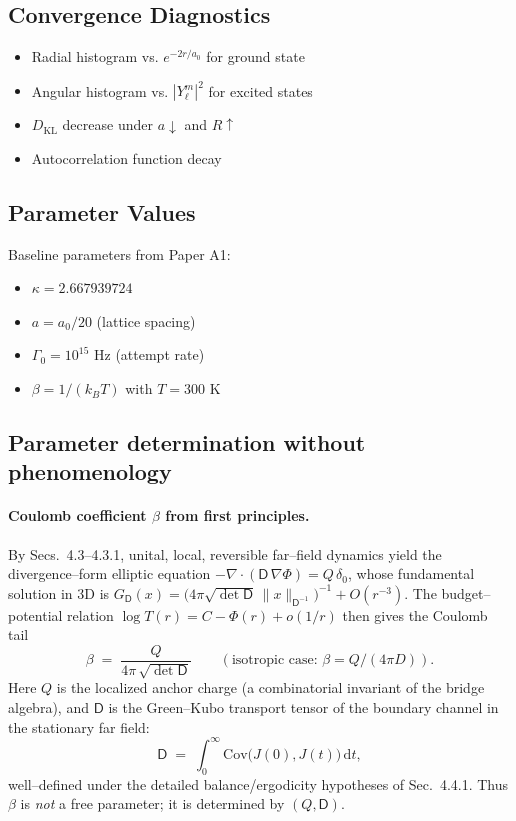 \documentclass[11pt]{article}
\theoremstyle{plain}
\theoremstyle{definition}
\begin{document}
\subsection{Convergence Diagnostics}

\begin{itemize}
  \item Radial histogram vs. $e^{-2r/a_0}$ for ground state
  \item Angular histogram vs. $|Y_\ell^m|^2$ for excited states
  \item $D_{\mathrm{KL}}$ decrease under $a\downarrow$ and $R\uparrow$
  \item Autocorrelation function decay
\end{itemize}

\subsection{Parameter Values}

Baseline parameters from Paper A1:
\begin{itemize}
  \item $\kappa = 2.667939724$
  \item $a = a_0/20$ (lattice spacing)
  \item $\Gamma_0 = 10^{15}$ Hz (attempt rate)
  \item $\beta = 1/(k_B T)$ with $T = 300$ K
\end{itemize}

\subsection{Parameter determination without phenomenology}\label{sec:param-determination}

\paragraph{Coulomb coefficient $\beta$ from first principles.}
By Secs.~4.3–4.3.1, unital, local, reversible far–field dynamics yield the divergence–form elliptic equation
$-\nabla\!\cdot\!(\mathsf{D}\,\nabla \Phi)=Q\,\delta_0$,
whose fundamental solution in 3D is
$G_{\mathsf{D}}(x)=\big(4\pi\sqrt{\det\mathsf{D}}\,\|x\|_{\mathsf{D}^{-1}}\big)^{-1}+O(r^{-3})$.
The budget–potential relation $\log T(r)=C-\Phi(r)+o(1/r)$ then gives the Coulomb tail
\begin{equation}\label{eq:beta-from-DQ}
  \beta \;=\; \frac{Q}{4\pi\,\sqrt{\det \mathsf{D}}}\qquad
  (\text{isotropic case: }\beta=Q/(4\pi D)).
\end{equation}
Here $Q$ is the localized anchor charge (a combinatorial invariant of the bridge algebra), and
$\mathsf{D}$ is the Green–Kubo transport tensor of the boundary channel in the stationary far field:
\[
  \mathsf{D} \;=\; \int_0^\infty \!\!\mathrm{Cov}\big(J(0),J(t)\big)\,\mathrm{d}t,
\]
well–defined under the detailed balance/ergodicity hypotheses of Sec.~4.4.1.
Thus $\beta$ is \emph{not} a free parameter; it is determined by $(Q,\mathsf{D})$.
\end{document}
